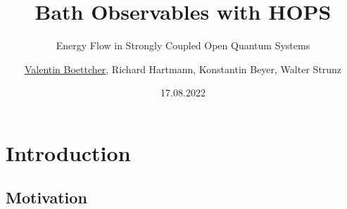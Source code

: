 \documentclass[10pt, aspectratio=169]{beamer}
\institute[TUD] %
{
  TU Dresden
}
\title{Bath Observables with HOPS}
\subtitle{Energy Flow in Strongly Coupled Open Quantum Systems}
\author{\underline{Valentin Boettcher}, Richard Hartmann,
  Konstantin Beyer, Walter Strunz}
\institute{Institute for Theoretical Physics, Dresden, Germany}
\date{17.08.2022}
\begin{document}
\hypersetup{pageanchor=false}
\begin{frame}[plain]
  \titlepage
\end{frame}

\hypersetup{pageanchor=true} 
\begin{frame}
  \tableofcontents
\end{frame}


\section{Introduction}
\label{sec:intro}

\subsection{Motivation}
\end{document}
